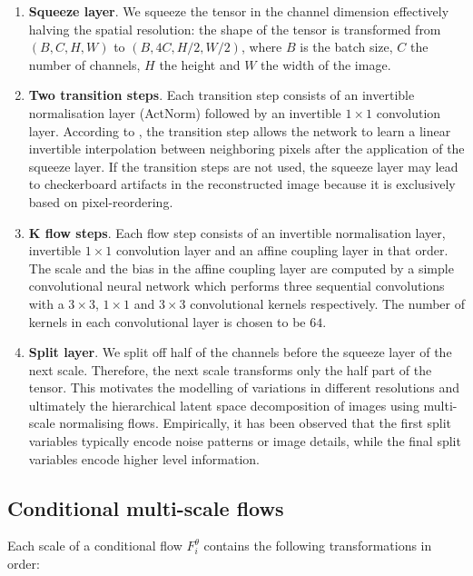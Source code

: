\begin{enumerate}
    \item \textbf{Squeeze layer}. We squeeze the tensor in the channel dimension effectively halving the spatial resolution: the shape of the tensor is transformed from $(B, C, H, W)$ to $(B, 4C, H/2, W/2)$, where $B$ is the batch size, $C$ the number of channels, $H$ the height and $W$ the width of the image.
    \item \textbf{Two transition steps}. Each transition step consists of an invertible normalisation layer (ActNorm) followed by an invertible $1\times 1$ convolution layer. According to \cite{SRFLOW}, the transition step allows the network to learn a linear invertible interpolation between neighboring pixels after the application of the squeeze layer. If the transition steps are not used, the squeeze layer may lead to checkerboard artifacts in the reconstructed image because it is exclusively based on pixel-reordering.
    \item \textbf{K flow steps}. Each flow step consists of an invertible normalisation layer, invertible $1\times 1$ convolution layer and an affine coupling layer in that order. The scale and the bias in the affine coupling layer are computed by a simple convolutional neural network which performs three sequential convolutions with a $3\times 3$, $1\times 1$ and $3\times 3$ convolutional kernels respectively. The number of kernels in each convolutional layer is chosen to be $64$.
    \item \textbf{Split layer}. We split off half of the channels before the squeeze layer of the next scale. Therefore, the next scale transforms only the half part of the tensor. This motivates the modelling of variations in different resolutions and ultimately the hierarchical latent space decomposition of images using multi-scale normalising flows. Empirically, it has been observed that the first split variables typically encode noise patterns or image details, while the final split variables encode higher level information.
    
\end{enumerate}
\newpage
\subsection{Conditional multi-scale flows}

Each scale of a conditional flow $F_i^{\theta}$ contains the following transformations in order:

